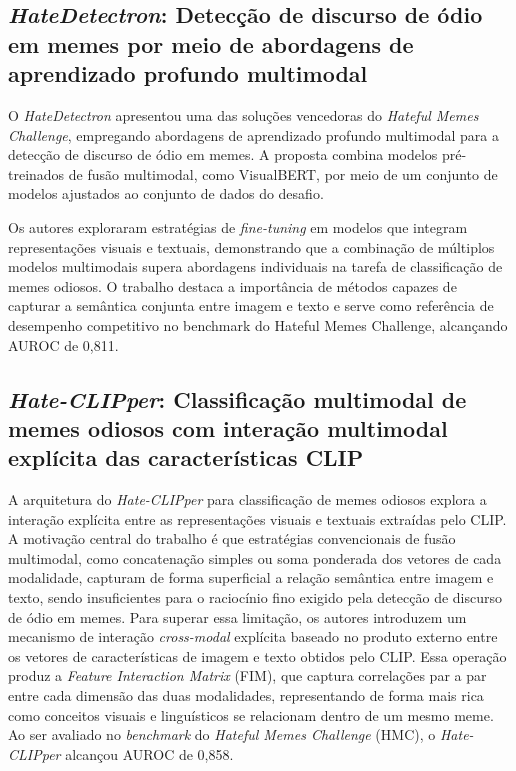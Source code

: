\subsection{\textit{HateDetectron}: Detecção de discurso de ódio em memes por meio de abordagens de aprendizado profundo multimodal}

O \textit{HateDetectron} \cite{velioglu2020} apresentou uma das soluções vencedoras do \textit{Hateful Memes Challenge}, empregando abordagens de aprendizado profundo multimodal para a detecção de discurso de ódio em memes. A proposta combina modelos pré-treinados de fusão multimodal, como VisualBERT, por meio de um conjunto de modelos ajustados ao conjunto de dados do desafio.

Os autores exploraram estratégias de \textit{fine-tuning} em modelos que integram
representações visuais e textuais, demonstrando que a combinação de múltiplos modelos multimodais supera abordagens individuais na tarefa de classificação de memes odiosos. O trabalho destaca a importância de métodos capazes de capturar a semântica conjunta entre imagem e texto e serve como referência de desempenho competitivo no benchmark do Hateful Memes Challenge, alcançando AUROC de 0,811.

\subsection{\textit{Hate-CLIPper}: Classificação multimodal de memes odiosos com interação multimodal explícita das características CLIP}

A arquitetura do \textit{Hate-CLIPper} \cite{kumar2022} para classificação de memes odiosos explora a interação explícita entre as representações visuais e textuais extraídas pelo CLIP. A motivação central do trabalho é que estratégias convencionais de fusão multimodal, como concatenação simples ou soma ponderada dos vetores de cada modalidade, capturam de forma superficial a relação semântica entre imagem e texto, sendo insuficientes para o raciocínio fino exigido pela detecção de discurso de ódio em memes. Para superar essa limitação, os autores introduzem um mecanismo de interação \textit{cross-modal} explícita baseado no produto externo entre os vetores de características de imagem e texto obtidos pelo CLIP. Essa operação produz a \textit{Feature Interaction Matrix} (FIM), que captura correlações par a par entre cada dimensão das duas modalidades, representando de forma mais rica como conceitos visuais e linguísticos se relacionam dentro de um mesmo meme. Ao ser avaliado no \textit{benchmark} do \textit{Hateful Memes Challenge} (HMC), o \textit{Hate-CLIPper} alcançou AUROC de 0,858.
